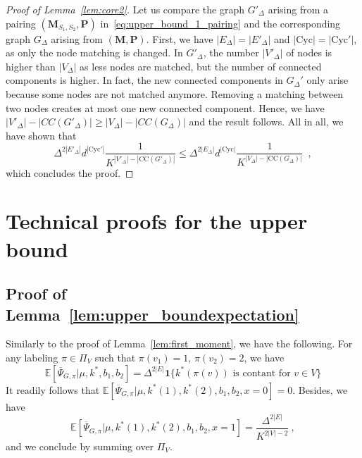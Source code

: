 \documentclass{article}
\begin{document}
        \begin{proof}[Proof of Lemma~\ref{lem:core2}]
    Let us compare the graph $G'_{\Delta}$ arising from a pairing $(\mathbf{M}_{S_1,S_2},\mathbf{P})$ in~\eqref{eq:upper_bound_1_pairing} and the corresponding  graph  $G_{\Delta}$ arising from $(\mathbf{M},\mathbf{P})$. First, we have $|E_{\Delta}|=|E'_{\Delta}|$ and $|\mathrm{Cyc}|=|\mathrm{Cyc}'|$, as only the node matching is changed. 
     In $G'_{\Delta}$, the number $|V'_{\Delta}|$ of nodes is higher than $|V_{\Delta}|$ as less nodes are matched, but the number of connected components is higher. In fact, the new connected components in $G_{\Delta}'$ only arise because some nodes are not matched anymore. Removing a matching between two nodes creates at most one new connected component. Hence, we have  $|V'_{\Delta}|- |CC(G'_{\Delta})|\geq |V_{\Delta}|- |CC(G_{\Delta})|$ and the result follows. All in all, we have shown that 
     \[
     \Delta^{2|E'_{\Delta}|}d^{|\mathrm{Cyc}'|}\frac{1}{K^{|V'_{\Delta}|-|\mathrm{CC}(G'_{\Delta})|}}\leq \Delta^{2|E_{\Delta}|}d^{|\mathrm{Cyc}|}\frac{1}{K^{|V_{\Delta}|-|\mathrm{CC}(G_{\Delta})|}}\enspace ,
     \]
     which concludes the proof. 
        \end{proof}





\section{Technical proofs for the upper bound}\label{sec:proof:technical:UB}


\subsection{Proof of Lemma~\ref{lem:upper_boundexpectation}}
    Similarly to the proof of Lemma~\ref{lem:first_moment}, we have the following. For any labeling $\pi\in \Pi_V$ such that $\pi(v_1)=1$, $\pi(v_2)=2$, we have 
\[
        \mathbb{E}[\overline{\Psi}_{G,\pi}|\mu, k^*,b_1,b_2]= \Delta^{2|E|} \mathbf{1}\{k^*(\pi(v))\text{ is  contant for } v\in V  \}
\] 
It readily follows that  $\mathbb{E}[\overline{\Psi}_{G,\pi}|\mu,k^*(1),k^*(2),b_1,b_2, x=0]=0$. Besides, we have 
\[
        \mathbb{E}[\overline{\Psi}_{G,\pi}|\mu, k^*(1),k^*(2),b_1,b_2,  x=1]= \frac{\Delta^{2|E|}}{K^{2|V|-2}} \ , 
\]
and we conclude by summing over $\Pi_{V}$. 
\end{document}
